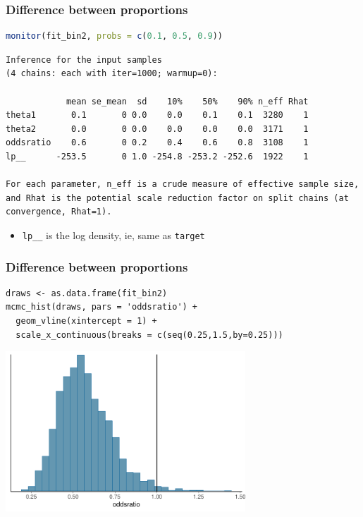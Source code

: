 \documentclass[10pt]{beamer}
\begin{document}
\begin{frame}[fragile]

\frametitle{Difference between proportions}

  {\small
\begin{lstlisting}[language=R]
monitor(fit_bin2, probs = c(0.1, 0.5, 0.9))
\end{lstlisting}
  }

  {\scriptsize
\begin{lstlisting}
Inference for the input samples
(4 chains: each with iter=1000; warmup=0):

            mean se_mean  sd    10%    50%    90% n_eff Rhat
theta1       0.1       0 0.0    0.0    0.1    0.1  3280    1
theta2       0.0       0 0.0    0.0    0.0    0.0  3171    1
oddsratio    0.6       0 0.2    0.4    0.6    0.8  3108    1
lp__      -253.5       0 1.0 -254.8 -253.2 -252.6  1922    1

For each parameter, n_eff is a crude measure of effective sample size,
and Rhat is the potential scale reduction factor on split chains (at
convergence, Rhat=1).
\end{lstlisting}
  }

  \begin{itemize}
  \item<2-> {\tt lp\_\_} is the log density, ie, same as {\tt target}
  \end{itemize}

\end{frame}

\begin{frame}[fragile]

\frametitle{Difference between proportions}

  {\small
\begin{lstlisting}
draws <- as.data.frame(fit_bin2)
mcmc_hist(draws, pars = 'oddsratio') +
  geom_vline(xintercept = 1) +
  scale_x_continuous(breaks = c(seq(0.25,1.5,by=0.25)))
\end{lstlisting}
  }

  \begin{center}
  \includegraphics[width=9cm]{figs/betablockoddsratio.pdf}
\end{center}
\end{frame}
\end{document}
